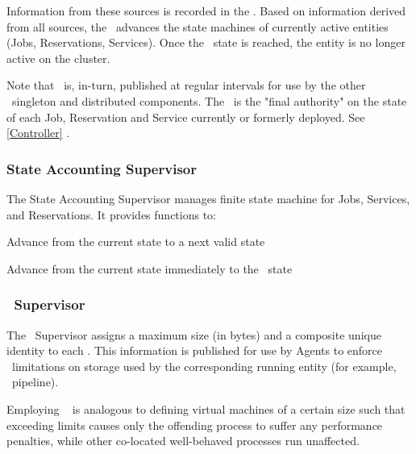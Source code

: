     Information from these sources is recorded in the \varORmap. 
    Based on information derived from all sources, the 
    \varOrchestrator~advances the state machines of currently active 
    entities (Jobs, Reservations, Services). 
    Once the \varCompleted~state is reached, the
    entity is no longer active on the cluster.
    
    Note that \varORmap~is, in-turn, published at regular intervals 
    for use by the other \varDUCC~singleton and distributed components.
    The \varORmap~is the "final authority" on the state of
    each Job, Reservation and Service currently or formerly deployed.
    See \ref{Controller} \varController.
    
    \subsubsection{State Accounting Supervisor} 
        
    The State Accounting Supervisor manages finite state machine for 
    Jobs, Services, and Reservations. It provides functions to:
    
    \begin{description}
    
    \item Advance from the current state to a next valid state
    \item Advance from the current state immediately to the \varCompleted~state
          
    \end{description} 
    
    \subsubsection{\varLinuxControlGroup~Supervisor}  
    
    The \varLinuxControlGroup~Supervisor assigns a maximum size (in bytes) and a composite
    unique identity to each \varShare. This information is published for use
    by Agents to enforce \varLinuxControlGroup~limitations on storage used by the corresponding
    running entity (for example, \varUIMA~pipeline).
    
    Employing \varLinuxControlGroups~ is analogous to defining virtual machines of a certain
    size such that exceeding limits causes only the offending process to suffer
    any performance penalties, while other co-located well-behaved processes
    run unaffected.
    
